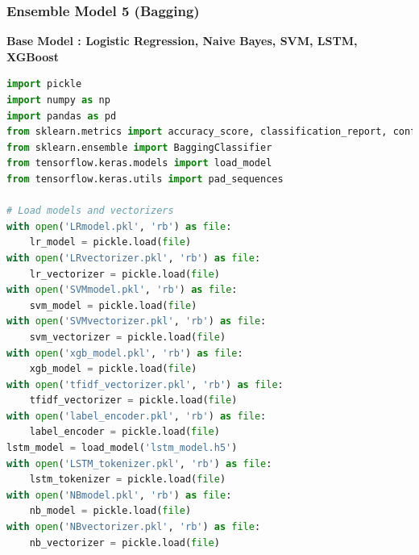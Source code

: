 \subsubsection{Ensemble Model 5 (Bagging)}

\noindent
\textbf{Base Model : Logistic Regression, Naive Bayes, SVM, LSTM, XGBoost}

\noindent
\begin{tcolorbox}[colback=gray!5!white, colframe=gray!80!black, boxrule=0.5pt, title=Evaluate Bagging Meta-Learner and Ensemble Model 5]
    \begin{lstlisting}[language=Python]
import pickle
import numpy as np
import pandas as pd
from sklearn.metrics import accuracy_score, classification_report, confusion_matrix
from sklearn.ensemble import BaggingClassifier
from tensorflow.keras.models import load_model
from tensorflow.keras.utils import pad_sequences

# Load models and vectorizers
with open('LRmodel.pkl', 'rb') as file:
    lr_model = pickle.load(file)
with open('LRvectorizer.pkl', 'rb') as file:
    lr_vectorizer = pickle.load(file)
with open('SVMmodel.pkl', 'rb') as file:
    svm_model = pickle.load(file)
with open('SVMvectorizer.pkl', 'rb') as file:
    svm_vectorizer = pickle.load(file)
with open('xgb_model.pkl', 'rb') as file:
    xgb_model = pickle.load(file)
with open('tfidf_vectorizer.pkl', 'rb') as file:
    tfidf_vectorizer = pickle.load(file)
with open('label_encoder.pkl', 'rb') as file:
    label_encoder = pickle.load(file)
lstm_model = load_model('lstm_model.h5')
with open('LSTM_tokenizer.pkl', 'rb') as file:
    lstm_tokenizer = pickle.load(file)
with open('NBmodel.pkl', 'rb') as file:
    nb_model = pickle.load(file)
with open('NBvectorizer.pkl', 'rb') as file:
    nb_vectorizer = pickle.load(file)
\end{lstlisting}
\end{tcolorbox}
